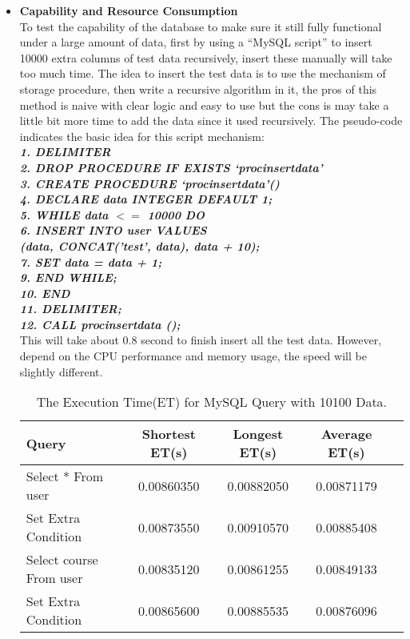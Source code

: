 \documentclass[12pt]{article}
\begin{document}
\begin{itemize}
\item\textbf{Capability and Resource Consumption}
\\To test the capability of the database to make sure it still fully functional under a large amount of data, first by using a ``MySQL script'' to insert 10000 extra columns of test data recursively, insert these manually will take too much time. The idea to insert the test data is to use the mechanism of storage procedure, then write a recursive algorithm in it, the pros of this method is naive with clear logic and easy to use but the cons is may take a little bit more time to add the data since it used recursively. The pseudo-code indicates the basic idea for this script mechanism:
\\\textit{\textbf{1. DELIMITER 
\\2. DROP PROCEDURE IF EXISTS `procinsertdata'
\\3. CREATE PROCEDURE `procinsertdata'()
\\4. DECLARE data INTEGER DEFAULT 1;
\\5. WHILE data $< =$ 10000 DO 
\\6. INSERT INTO user VALUES
\\(data, CONCAT('test', data), data + 10);
\\7. SET data = data + 1;
\\9. END WHILE; 
\\10. END
\\11. DELIMITER;
\\12. CALL procinsertdata ();}}
\\This will take about 0.8 second to finish insert all the test data. However, depend on the CPU performance and memory usage, the speed will be slightly different.
\begin{table}[h]
\centering
\begin{tabular}{|l|c|c|c|c|}\hline
Query&Shortest ET(s)&Longest ET(s)&Average ET(s)\\\hline
Select * From user&0.00860350&0.00882050&0.00871179\\
Set Extra Condition &0.00873550&0.00910570&0.00885408\\\hline
Select course From user&0.00835120&0.00861255&0.00849133\\
Set Extra Condition&0.00865600&0.00885535&0.00876096\\\hline
\end{tabular}
\caption{The Execution Time(ET) for MySQL Query with 10100 Data.}
\label{tab:Margin_settings}
\end{table}
\end{itemize}
\end{document}
